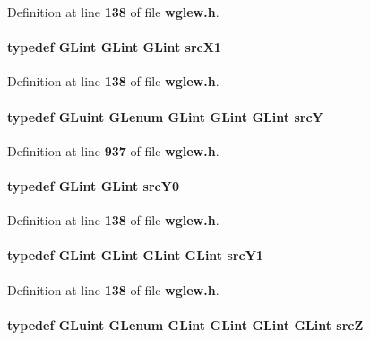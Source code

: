 Definition at line {\bf 138} of file {\bf wglew.\+h}.

\paragraph[{src\+X1}]{\setlength{\rightskip}{0pt plus 5cm}typedef {\bf G\+Lint} {\bf G\+Lint} {\bf G\+Lint} {\bf src\+X1}}\label{wglew_8h_aebfed1e726d2317b9a38066b850851f2}


Definition at line {\bf 138} of file {\bf wglew.\+h}.

\paragraph[{srcY}]{\setlength{\rightskip}{0pt plus 5cm}typedef {\bf G\+Luint} {\bf G\+Lenum} {\bf G\+Lint} {\bf G\+Lint} {\bf G\+Lint} {\bf srcY}}\label{wglew_8h_a249f2564a36627d1c6e0a54b7a09a42e}


Definition at line {\bf 937} of file {\bf wglew.\+h}.

\paragraph[{src\+Y0}]{\setlength{\rightskip}{0pt plus 5cm}typedef {\bf G\+Lint} {\bf G\+Lint} {\bf src\+Y0}}\label{wglew_8h_acfbcedf60191644a2b2d902d58c649a6}


Definition at line {\bf 138} of file {\bf wglew.\+h}.

\paragraph[{src\+Y1}]{\setlength{\rightskip}{0pt plus 5cm}typedef {\bf G\+Lint} {\bf G\+Lint} {\bf G\+Lint} {\bf G\+Lint} {\bf src\+Y1}}\label{wglew_8h_a984bfb8b4e4ca01283408e678ec451ef}


Definition at line {\bf 138} of file {\bf wglew.\+h}.

\paragraph[{srcZ}]{\setlength{\rightskip}{0pt plus 5cm}typedef {\bf G\+Luint} {\bf G\+Lenum} {\bf G\+Lint} {\bf G\+Lint} {\bf G\+Lint} {\bf G\+Lint} {\bf srcZ}}\label{wglew_8h_a116aa3a1e32f7bda3b7f6c80ff6b806f}


